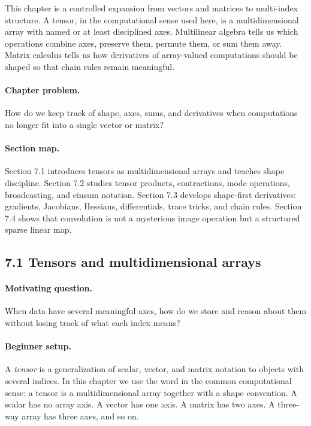 This chapter is a controlled expansion from vectors and matrices to multi-index structure. A tensor, in the computational sense used here, is a multidimensional array with named or at least disciplined axes. Multilinear algebra tells us which operations combine axes, preserve them, permute them, or sum them away. Matrix calculus tells us how derivatives of array-valued computations should be shaped so that chain rules remain meaningful.

\paragraph{Chapter problem.}
How do we keep track of shape, axes, sums, and derivatives when computations no longer fit into a single vector or matrix?

\paragraph{Section map.}
Section 7.1 introduces tensors as multidimensional arrays and teaches shape discipline. Section 7.2 studies tensor products, contractions, mode operations, broadcasting, and einsum notation. Section 7.3 develops shape-first derivatives: gradients, Jacobians, Hessians, differentials, trace tricks, and chain rules. Section 7.4 shows that convolution is not a mysterious image operation but a structured sparse linear map.

\subsection{7.1 Tensors and multidimensional arrays}

\paragraph{Motivating question.}
When data have several meaningful axes, how do we store and reason about them without losing track of what each index means?

\paragraph{Beginner setup.}
A \emph{tensor} is a generalization of scalar, vector, and matrix notation to objects with several indices. In this chapter we use the word in the common computational sense: a tensor is a multidimensional array together with a shape convention. A scalar has no array axis. A vector has one axis. A matrix has two axes. A three-way array has three axes, and so on.

